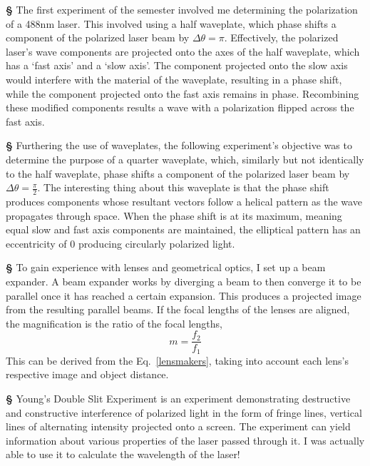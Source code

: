 \documentclass[12pt]{article}
\begin{document}
\vspace{15px}
\noindent
\large{\textbf{\S}} The first experiment of the semester involved me determining the polarization of a 488nm laser. This involved using a half waveplate, which phase shifts a component of the polarized laser beam by $\Delta\theta=\pi$. Effectively, the polarized laser's wave components are projected onto the axes of the half waveplate, which has a `fast axis' and a `slow axis'. The component projected onto the slow axis would interfere with the material of the waveplate, resulting in a phase shift, while the component projected onto the fast axis remains in phase. Recombining these modified components results a wave with a polarization flipped across the fast axis.

\vspace{15px}
\noindent
\large{\textbf{\S}} Furthering the use of waveplates, the following experiment's objective was to determine the purpose of a quarter waveplate, which, similarly but not identically to the half waveplate, phase shifts a component of the polarized laser beam by $\Delta\theta=\frac{\pi}{2}$. The interesting thing about this waveplate is that the phase shift produces components whose resultant vectors follow a helical pattern as the wave propagates through space. When the phase shift is at its maximum, meaning equal slow and fast axis components are maintained, the elliptical pattern has an eccentricity of 0 producing circularly polarized light.

\vspace{15px}
\noindent
\large{\textbf{\S}} To gain experience with lenses and geometrical optics, I set up a beam expander. A beam expander works by diverging a beam to then converge it to be parallel once it has reached a certain expansion. This produces a projected image from the resulting parallel beams. If the focal lengths of the lenses are aligned, the magnification is the ratio of the focal lengths,
\begin{equation}\label{magnification}
m=\frac{f_2}{f_1}
\end{equation}
This can be derived from the Eq.~\eqref{lensmakers}, taking into account each lens's respective image and object distance.

\vspace{15px}
\noindent
\large{\textbf{\S}} Young's Double Slit Experiment is an experiment demonstrating destructive and constructive interference of polarized light in the form of fringe lines, vertical lines of alternating intensity projected onto a screen. The experiment can yield information about various properties of the laser passed through it. I was actually able to use it to calculate the wavelength of the laser!
\end{document}
